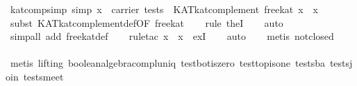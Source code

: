 \begin{isabellebody}
\isanewline
{}\isamarkupfalse%
\ kat{}comp{}simp\ {}simp{}{}\ {}x\ {}\ carrier\ tests\ {}\ KAT{}kat{}complement\ free{}kat\ x\ {}\ {}x{}\isanewline
%
\isadelimproof
\ \ %
\endisadelimproof
%
\isatagproof
{}\isamarkupfalse%
\ {}subst\ KAT{}kat{}complement{}def{}OF\ free{}kat{}{}\isanewline
\ \ \isamarkupfalse%
\ {}rule\ the{}I{}{}\isanewline
\ \ \isamarkupfalse%
\ auto\isanewline
\ \ \isamarkupfalse%
\ {}simp{}all\ add{}\ free{}kat{}def{}\isanewline
\ \ \isamarkupfalse%
\ {}rule{}tac\ x\ {}\ {}{}x{}\ \ exI{}\isanewline
\ \ \isamarkupfalse%
\ auto\isanewline
\ \ \isamarkupfalse%
\ {}metis\ not{}closed{}\isanewline
\ \ \isamarkupfalse%
\ {}\isanewline
\ \ \isamarkupfalse%
\ {}metis\ {}lifting{}\ boolean{}algebra{}compl{}uniq\ test{}bot{}is{}zero\ test{}top{}is{}one\ tests{}ba\ tests{}join\ tests{}meet{}\isanewline

\end{isabellebody}
